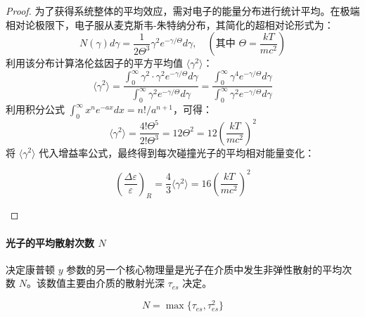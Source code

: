 \begin{enumerate}[label = (\arabic*)]
\begin{proof}
        为了获得系统整体的平均效应，需对电子的能量分布进行统计平均。在极端相对论极限下，电子服从麦克斯韦-朱特纳分布，其简化的超相对论形式为：
        \begin{equation}
            N(\gamma) d\gamma = \frac{1}{2\Theta^3} \gamma^2 e^{-\gamma/\Theta} d\gamma, \quad (\text{其中 } \Theta = \frac{kT}{mc^2})
        \end{equation}
        利用该分布计算洛伦兹因子的平方平均值 $\langle \gamma^2 \rangle$：
        \begin{equation}
            \langle \gamma^2 \rangle = \frac{\int_0^\infty \gamma^2 \cdot \gamma^2 e^{-\gamma/\Theta} d\gamma}{\int_0^\infty \gamma^2 e^{-\gamma/\Theta} d\gamma} = \frac{\int_0^\infty \gamma^4 e^{-\gamma/\Theta} d\gamma}{\int_0^\infty \gamma^2 e^{-\gamma/\Theta} d\gamma}
        \end{equation}
        利用积分公式 $\int_0^\infty x^n e^{-ax} dx = n!/a^{n+1}$，可得：
        \begin{equation}
            \langle \gamma^2 \rangle = \frac{4! \Theta^5}{2! \Theta^3} = 12 \Theta^2 = 12 \left( \frac{kT}{mc^2} \right)^2
        \end{equation}
        将 $\langle \gamma^2 \rangle$ 代入增益率公式，最终得到每次碰撞光子的平均相对能量变化：
        \begin{tcolorbox}[colframe=black, colback=white, boxrule=0.5pt, arc=0pt]
        \begin{equation}
            \left( \frac{\Delta \varepsilon}{\varepsilon} \right)_{R} = \frac{4}{3} \langle \gamma^2 \rangle = 16 \left( \frac{kT}{mc^2} \right)^2
        \end{equation}
        \end{tcolorbox}
    \end{proof}
\end{enumerate}

\paragraph{光子的平均散射次数 $N$}
决定康普顿 $y$ 参数的另一个核心物理量是光子在介质中发生非弹性散射的平均次数 $N$。该数值主要由介质的散射光深 $\tau_{es}$ 决定。

\begin{tcolorbox}[colframe=black, colback=white, boxrule=0.5pt, arc=0pt]
\begin{equation}
    N = \max\{\tau_{es}, \tau_{es}^2\}
\end{equation}
\end{tcolorbox}

